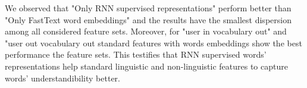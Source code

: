 We observed that "Only RNN supervised representations" perform better than "Only FastText word embeddings" and the results have the smallest dispersion among all considered feature sets. Moreover,  for "user in vocabulary out" and "user out vocabulary out standard features with words embeddings show the best performance the feature sets. This testifies that RNN supervised words' representations help standard linguistic and non-linguistic features to capture words' understandibility better.  